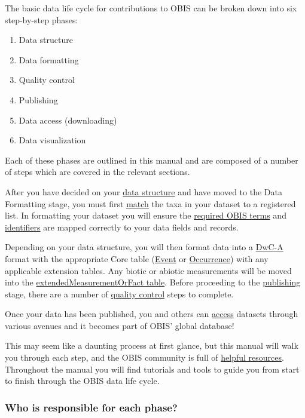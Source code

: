 \documentclass[
  letterpaper,
  DIV=11,
  numbers=noendperiod,
  oneside]{scrreprt}
\providecommand{\tightlist}{%
  \setlength{\itemsep}{0pt}\setlength{\parskip}{0pt}}\usepackage{longtable,booktabs,array}
\begin{document}
The basic data life cycle for contributions to OBIS can be broken down
into six step-by-step phases:

\begin{enumerate}
\def\labelenumi{\arabic{enumi}.}
\tightlist
\item
  Data structure
\item
  Data formatting
\item
  Quality control
\item
  Publishing
\item
  Data access (downloading)
\item
  Data visualization
\end{enumerate}

Each of these phases are outlined in this manual and are composed of a
number of steps which are covered in the relevant sections.

After you have decided on your \href{formatting.html}{data structure}
and have moved to the Data Formatting stage, you must first
\href{name_matching.html}{match} the taxa in your dataset to a
registered list. In formatting your dataset you will ensure the
\href{checklist.html}{required OBIS terms} and
\href{identifiers.html}{identifiers} are mapped correctly to your data
fields and records.

Depending on your data structure, you will then format data into a
\href{data_format.html}{DwC-A} format with the appropriate Core table
(\href{format_event.html}{Event} or
\href{format_occurrence.html}{Occurrence}) with any applicable extension
tables. Any biotic or abiotic measurements will be moved into the
\href{format_emof.html}{extendedMeasurementOrFact table}. Before
proceeding to the \href{data_publication.html}{publishing} stage, there
are a number of \href{dataquality.html}{quality control} steps to
complete.

Once your data has been published, you and others can
\href{access.html}{access} datasets through various avenues and it
becomes part of OBIS' global database!

This may seem like a daunting process at first glance, but this manual
will walk you through each step, and the OBIS community is full of
\href{gethelp.html}{helpful resources}. Throughout the manual you will
find tutorials and tools to guide you from start to finish through the
OBIS data life cycle.

\hypertarget{who-is-responsible-for-each-phase}{%
\subsubsection{Who is responsible for each
phase?}\label{who-is-responsible-for-each-phase}}
\end{document}
